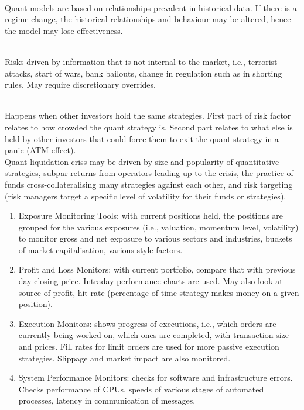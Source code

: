 \documentclass[a4paper,oneside,openany]{book}
\begin{document}
\begin{definition} \\
Quant models are based on relationships prevalent in historical data. If there is a regime change, the historical relationships and behaviour may be altered, hence the model may lose effectiveness.
\end{definition}

\begin{definition} \\	
Risks driven by information that is not internal to the market, i.e., terrorist attacks, start of wars, bank bailouts, change in regulation such as in shorting rules. May require discretionary overrides.
\end{definition}

\begin{definition} \\
Happens when other investors hold the same strategies. First part of risk factor relates to how crowded the quant strategy is. Second part relates to what else is held by other investors that could force them to exit the quant strategy in a panic (ATM effect).\\
Quant liquidation criss may be driven by size and popularity of quantitative strategies, subpar returns from operators leading up to the crisis, the practice of funds cross-collateralising many strategies against each other, and risk targeting (risk managers target a specific level of volatility for their funds or strategies).
\end{definition}

\begin{method} 
\begin{enumerate}[label=\roman*.]
\setlength{\itemsep}{0pt}
\item Exposure Monitoring Tools: with current positions held, the positions are grouped for the various exposures (i.e., valuation, momentum level, volatility) to monitor gross and net exposure to various sectors and industries, buckets of market capitalisation, various style factors.
\item Profit and Loss Monitors: with current portfolio, compare that with previous day closing price. Intraday performance charts are used. May also look at source of profit, hit rate (percentage of time strategy makes money on a given position).
\item Execution Monitors: shows progress of executions, i.e., which orders are currently being worked on, which ones are completed, with transaction size and prices. Fill rates for limit orders are used for more passive execution strategies. Slippage and market impact are also monitored.
\item System Performance Monitors: checks for software and infrastructure errors. Checks performance of CPUs, speeds of various stages of automated processes, latency in communication of messages.
\end{enumerate}
\end{method}
\end{document}
